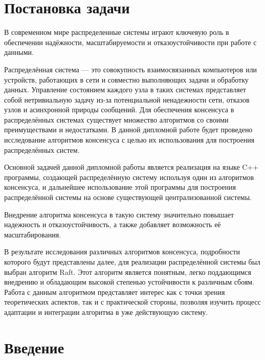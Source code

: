 \documentclass[subf, href, colorlinks=true, 14pt,
times, mtpro, specialist]{disser}
\theoremstyle{definition}
\begin{document}
	
	\setcounter{tocdepth}{2}
	
	\tableofcontents
	\pagebreak



\section{Постановка задачи}

В современном мире распределенные системы играют ключевую роль в обеспечении надёжности, масштабируемости и отказоустойчивости при работе с данными. 

Распределённая система --- это совокупность взаимосвязанных компьютеров или устройств, работающих в сети и совместно выполняющих задачи и обработку данных. Управление состоянием каждого узла в таких системах представляет собой нетривиальную задачу из-за потенциальной ненадежности сети, отказов узлов и асинхронной природы сообщений. Для обеспечения консенсуса в распределённых системах существует множество алгоритмов со своими преимуществами и недостатками. В данной дипломной работе будет проведено исследование алгоритмов консенсуса с целью их использования для построения распределённых систем.

Основной задачей данной дипломной работы является реализация на языке C++ программы, создающей распределённую систему используя один из алгоритмов консенсуса, и дальнейшее использование этой программы для построения распределённой системы на основе существующей централизованной системы.

Внедрение алгоритма консенсуса в такую систему значительно повышает надежность и отказоустойчивость, а также добавляет возможность её масштабирования. 

В результате исследования различных алгоритмов консенсуса, подробности которого будут представлены далее, для реализации распределённой системы был выбран алгоритм Raft. Этот алгоритм является понятным, легко поддающимся внедрению и обладающим высокой степенью устойчивости к различным сбоям. Работа с данным алгоритмом представляет интерес как с точки зрения теоретических аспектов, так и с практической стороны, позволяя изучить процесс адаптации и интеграции алгоритма в уже действующую систему.

\section{Введение}
\end{document}
